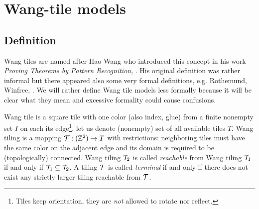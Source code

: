 \section{Wang-tile models}
\label{sec:wang}

\subsection{Definition}
	
	
	Wang tiles are named after Hao Wang who introduced this concept in his work {\em Proving Theorems by Pattern Recognition}, \cite{wang_tiles}. His original definition was rather informal but there appeared also some very formal definitions, e.g. Rothemund, Winfree, \cite{square_lb}. We will rather define Wang tile models less formally because it will be clear what they mean and excessive formality could cause confusions.
	
	Wang tile is a square tile with one color (also index, glue) from a finite nonempty set $I$ on each its edge\footnote{Tiles keep orientation, they are {\em not} allowed to rotate nor reflect.}, let us denote (nonempty) set of all available tiles $T$. Wang tiling is a mapping ${\cal T}: (\mathbb{Z}^2) \rightarrow T$ with restrictions: neighboring tiles must have the same color on the adjacent edge and its domain is required to be (topologically) connected. Wang tiling ${\cal T}_2$ is called {\em reachable} from Wang tiling ${\cal T}_1$ if and only if ${\cal T}_1 \subseteq {\cal T}_2$. A tiling $\cal T$ is called {\em terminal} if and only if there does not exist any strictly larger tiling reachable from $\cal T$. %
	
